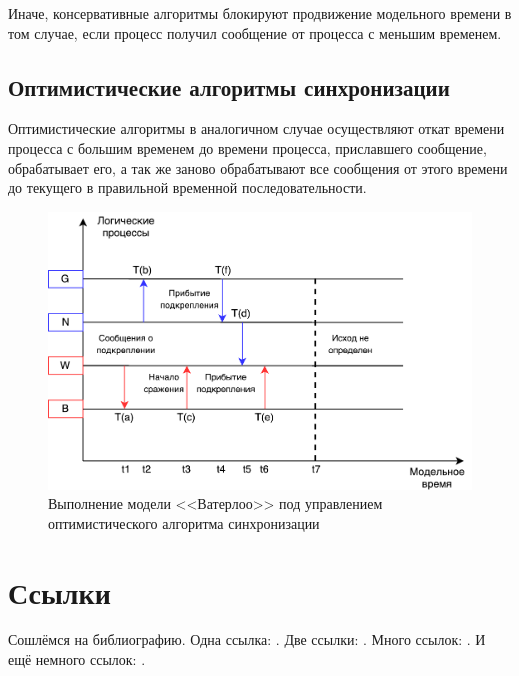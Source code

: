 Иначе, консервативные алгоритмы блокируют продвижение модельного времени в том случае, если процесс получил сообщение от процесса с меньшим временем.


\subsection{Оптимистические алгоритмы синхронизации} \label{subsect2}

Оптимистические алгоритмы в аналогичном случае осуществляют откат времени процесса с большим временем до времени процесса, приславшего сообщение, обрабатывает его, а так же заново обрабатывают все сообщения от этого времени до текущего в правильной временной последовательности.

\begin{figure}[!ht]
\centering
\includegraphics[scale=1]{images/waterloo-oas.pdf}
\caption{Выполнение модели <<Ватерлоо>> под управлением оптимистического алгоритма синхронизации}
\label{fig:Некорректная временная диаграмма исполнения модели}
\end{figure}


\section{Ссылки} \label{sect1_2}
Сошлёмся на библиографию. Одна ссылка: \cite[с.~54]{Sokolov}\cite[с.~36]{Gaidaenko}. Две ссылки: \cite{Sokolov,Gaidaenko}. Много ссылок:  \cite[с.~54]{Lermontov,Management,Borozda} \cite{Lermontov,Management,Borozda,Marketing,Constitution,FamilyCode,Gost.7.0.53,Razumovski,Lagkueva,Pokrovski,Sirotko,Lukina,Methodology,Encyclopedia,Nasirova,Berestova,Kriger}. И ещё немного ссылок: \cite{Article,Book,Booklet,Conference,Inbook,Incollection,Manual,Mastersthesis,Misc,Phdthesis,Proceedings,Techreport,Unpublished}. \cite{medvedev2006jelektronnye, CEAT:CEAT581, doi:10.1080/01932691.2010.513279,Gosele1999161,Li2007StressAnalysis, Shoji199895,test:eisner-sample,AB_patent_Pomerantz_1968,iofis_patent1960}

